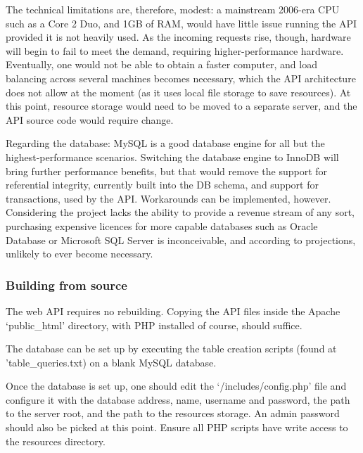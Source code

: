         The technical limitations are, therefore, modest: a mainstream 2006-era CPU such as a Core 2 Duo, and 1GB of RAM, would have little issue running the API provided it is not heavily used. As the incoming requests rise, though, hardware will begin to fail to meet the demand, requiring higher-performance hardware. Eventually, one would not be able to obtain a faster computer, and load balancing across several machines becomes necessary, which the API architecture does not allow at the moment (as it uses local file storage to save resources). At this point, resource storage would need to be moved to a separate server, and the API source code would require change. 
    
        Regarding the database: MySQL is a good database engine for all but the highest-performance scenarios. Switching the database engine to InnoDB will bring further performance benefits, but that would remove the support for referential integrity, currently built into the DB schema, and support for transactions, used by the API. Workarounds can be implemented, however. Considering the project lacks the ability to provide a revenue stream of any sort, purchasing expensive licences for more capable databases such as Oracle Database or Microsoft SQL Server is inconceivable, and according to projections, unlikely to ever become necessary.

    \subsubsection{Building from source}
        The web API requires no rebuilding. Copying the API files inside the Apache `public\_html' directory, with PHP installed of course, should suffice.
    
        The database can be set up by executing the table creation scripts (found at 'table\_queries.txt) on a blank MySQL database.
    
        Once the database is set up, one should edit the `/includes/config.php' file and configure it with the database address, name, username and password, the path to the server root, and the path to the resources storage. An admin password should also be picked at this point. Ensure all PHP scripts have write access to the resources directory.